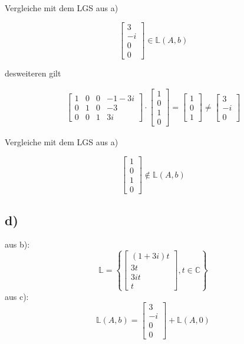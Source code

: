 \documentclass[a4paper, 11pt]{article}
\begin{document}
Vergleiche mit dem LGS aus a)

$$ \begin{bmatrix} 3 \\ -i \\ 0 \\ 0 \end{bmatrix} \in \mathbb{L}(A, b) $$

desweiteren gilt

\begin{align*}
    \begin{bmatrix}
        1 & 0 & 0 & -1-3i \\
        0 & 1 & 0 & -3 \\
        0 & 0 & 1 & 3i
    \end{bmatrix} \cdot
    \begin{bmatrix}
        1 \\
        0 \\
        1 \\
        0
    \end{bmatrix} = \begin{bmatrix} 1 \\ 0 \\ 1 \end{bmatrix} \neq \begin{bmatrix} 3 \\ -i \\ 0 \end{bmatrix}
\end{align*}

Vergleiche mit dem LGS aus a)

$$ \begin{bmatrix} 1 \\ 0 \\ 1 \\ 0 \end{bmatrix} \not\in \mathbb{L}(A, b) $$

\subsection{d)}
\label{sec:orga02fdc8}
aus b):
$$\mathbb{L} = \left\{\begin{bmatrix} (1 + 3i)t \\ 3t \\ 3it \\ t\end{bmatrix}, t \in \mathbb{C}\right\}$$
\newline
aus c):
$$\mathbb{L}(A, b) = \begin{bmatrix} 3 \\ -i \\ 0 \\ 0\end{bmatrix} + \mathbb{L}(A, 0)$$
\end{document}
